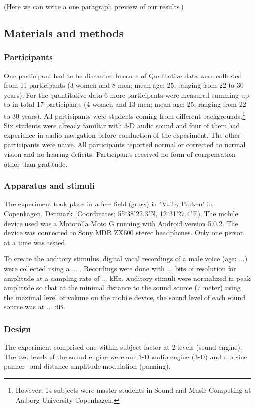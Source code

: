 \documentclass[journal]{IEEEtran}
\begin{document}
(Here we can write a one paragraph preview of our results.)
\subsection{Materials and methods}
\subsubsection{Participants}
One participant had to be discarded because of 
Qualitative data were collected from 11 participants (3 women and 8 men; mean age: 25, ranging from 22 to 30 years). For the quantitative data 6 more participants were measured summing up to in total 17 participants (4 women and 13 men; mean age: 25, ranging from 22 to 30 years). All participants were students coming from different backgrounds.\footnote{However, 14 subjects were master students in Sound and Music Computing at Aalborg University Copenhagen.} Six students were already familiar with 3-D audio sound and four of them had experience in audio navigation before conduction of the experiment. The other participants were naive. All participants reported normal or corrected to normal vision and no hearing deficits. Participants received no form of compensation other than gratitude. 

\subsubsection{Apparatus and stimuli}
The experiment took place in a free field (grass) in "Valby Parken" in Copenhagen, Denmark (Coordinates: 55$^\circ$38'22.3"N, 12$^\circ$31'27.4"E). The mobile device used was a Motorolla Moto G running with Android version 5.0.2. The device was connected to Sony MDR ZX600 stereo headphones. Only one person at a time was tested. 

To create the auditory stimulus, digital vocal recordings of a male voice (age: ...) were collected using a ... . Recordings were done with ... bits of resolution for amplitude at a sampling rate of ...  kHz. Auditory stimuli were normalized in peak amplitude so that at the minimal distance to the sound source (7 meter) using the maximal level of volume on the mobile device, the sound level of each sound source was at ... dB. 

\subsubsection{Design}
The experiment comprised one within subject factor at 2 levels (sound engine). The two levels of the sound engine were our 3-D audio engine (3-D) and a cosine panner~\cite{AndyFarnell2010} and distance amplitude modulation (panning).
\end{document}
